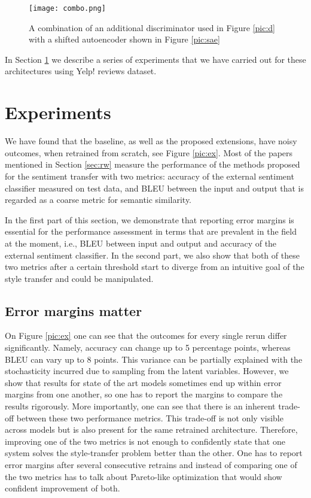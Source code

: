 \documentclass[11pt,a4paper]{article}
\begin{document}
\begin{figure}[ht]
\begin{center}
\centerline{\texttt{[image: combo.png]}}
\caption{A combination of an additional discriminator used in Figure \ref{pic:d} with a shifted autoencoder shown in Figure \ref{pic:sae}}
\label{pic:combo}
\end{center}
\end{figure}


In Section \ref{sec:ex} we describe a series of experiments that we have carried out for these architectures using Yelp! reviews dataset.

\section{Experiments}
\label{sec:ex}
We have found that the baseline, as well as the proposed extensions,  have noisy outcomes, when retrained from scratch, see Figure \ref{pic:ex}. Most of the papers mentioned in Section \ref{sec:rw} measure the performance of the methods proposed for the sentiment transfer with two metrics: accuracy of the external sentiment classifier measured on test data, and BLEU between the input and output that is regarded as a coarse metric for semantic similarity. 


In the first part of this section, we demonstrate that reporting error margins is essential for the performance assessment in terms that are prevalent in the field at the moment, i.e., BLEU between input and output and accuracy of the external sentiment classifier. In the second part, we also show that both of these two metrics after a certain threshold start to diverge from an intuitive goal of the style transfer and could be manipulated.

\subsection{Error margins matter}
\label{sec:no}

On Figure \ref{pic:ex} one can see that the outcomes for every single rerun differ significantly. Namely, accuracy can change up to 5 percentage points, whereas BLEU can vary up to 8 points. This variance can be partially explained with the stochasticity incurred due to sampling from the latent variables. However, we show that results for state of the art models sometimes end up within error margins from one another, so one has to report the margins to compare the results rigorously.   More importantly, one can see that there is an inherent trade-off between these two performance metrics. This trade-off is not only visible across models but is also present for the same retrained architecture. Therefore, improving one of the two metrics is not enough to confidently state that one system solves the style-transfer problem better than the other. One has to report error margins after several consecutive retrains and instead of comparing one of the two metrics has to talk about Pareto-like optimization that would show confident improvement of both.
\end{document}
